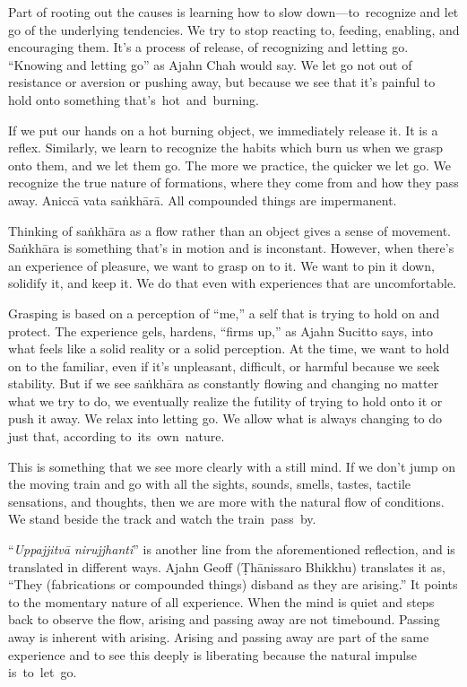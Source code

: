 Part of rooting out the causes is learning how to slow down---\mbox{to recognize} and let go of the underlying tendencies. We try to stop reacting to, feeding, enabling, and encouraging them. It's a process of release, of recognizing and letting go. ``Knowing and letting go'' as Ajahn Chah would say. We let go not out of resistance or aversion or pushing away, but because we see that it's painful to hold onto something \mbox{that's hot and burning.}

If we put our hands on a hot burning object, we immediately release it. It is a reflex. Similarly, we learn to recognize the habits which burn us when we grasp onto them, and we let them go. The more we practice, the quicker we let go. We recognize the true nature of formations, where they come from and how they pass away. Aniccā vata saṅkhārā. All compounded things are impermanent.

Thinking of saṅkhāra as a flow rather than an object gives a sense of movement. Saṅkhāra is something that's in motion and is inconstant. However, when there's an experience of pleasure, we want to grasp on to it. We want to pin it down, solidify it, and keep it. We do that even with experiences that are uncomfortable.

Grasping is based on a perception of ``me,'' a self that is trying to hold on and protect. The experience gels, hardens, ``firms up,'' as Ajahn Sucitto says, into what feels like a solid reality or a solid perception. At the time, we want to hold on to the familiar, even if it's unpleasant, difficult, or harmful because we seek stability. But if we see saṅkhāra as constantly flowing and changing no matter what we try to do, we eventually realize the futility of trying to hold onto it or push it away. We relax into letting go. We allow what is always changing to do just that, according \mbox{to its own nature.}

This is something that we see more clearly with a still mind. If we don't jump on the moving train and go with all the sights, sounds, smells, tastes, tactile sensations, and thoughts, then we are more with the natural flow of conditions. We stand beside the track and watch the \mbox{train pass by.}

``\emph{Uppajjitvā nirujjhanti}'' is another line from the aforementioned reflection, and is translated in different ways. Ajahn Geoff (Ṭhānissaro Bhikkhu) translates it as, ``They (fabrications or compounded things) disband as they are arising.'' It points to the momentary nature of all experience. When the mind is quiet and steps back to observe the flow, arising and passing away are not timebound. Passing away is inherent with arising. Arising and passing away are part of the same experience and to see this deeply is liberating because the natural impulse \mbox{is to let go.}

